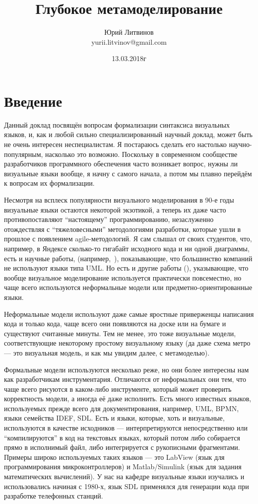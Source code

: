 \documentclass[a5paper]{article}
\title{Глубокое метамоделирование}
\author{Юрий Литвинов\\\small{yurii.litvinov@gmail.com}}
\date{13.03.2018г}
\begin{document}
\maketitle
\thispagestyle{empty}

\section*{Введение}

Данный доклад посвящён вопросам формализации синтаксиса визуальных языков, и, как и любой сильно специализированный научный доклад, может быть не очень интересен неспециалистам. Я постараюсь сделать его настолько научно-популярным, насколько это возможно. Поскольку в современном сообществе разработчиков программного обеспечения часто возникает вопрос, нужны ли визуальные языки вообще, я начну с самого начала, а потом мы плавно перейдём к вопросам их формализации.

Несмотря на всплеск популярности визуального моделирования в 90-е годы визуальные языки остаются некоторой экзотикой, а теперь их даже часто противопоставляют ``настоящему'' программированию, незаслуженно отождествляя с ``тяжеловесными'' методологиями разработки, которые ушли в прошлое с появлением agile-методологий. Я сам слышал от своих студентов, что, например, в Яндексе сколько-то гигабайт исходного кода и ни одной диаграммы, есть и научные работы, (например,~\cite{petre2013uml}), показывающие, что большинство компаний не используют языки типа UML. Но есть и другие работы (\cite{whittle2014mde}), указывающие, что вообще визуальное моделирование используется практически повсеместно, но чаще всего используются неформальные модели или предметно-ориентированные языки.

Неформальные модели используют даже самые яростные приверженцы написания кода и только кода, чаще всего они появляются на доске или на бумаге и существуют считанные минуты. Тем не менее, это тоже визуальные модели, соответствующие некоторому простому визуальному языку (да даже схема метро --- это визуальная модель, и как мы увидим далее, с метамоделью). 

Формальные модели используются несколько реже, но они более интересны нам как разработчикам инструментария. Отличаются от неформальных они тем, что чаще всего рисуются в каком-либо инструменте, который может проверить корректность модели, а иногда её даже исполнить. Есть много известных языков, используемых прежде всего для документирования, например, UML, BPMN, языки семейства IDEF, SDL. Есть и языки, которые, хоть и визуальные, используются в качестве исходников --- интерпретируются непосредственно или ``компилируются'' в код на текстовых языках, который потом либо собирается прямо в исполнимый файл, либо интегрируется с рукописными фрагментами. Примеры широко используемых таких языков --- это LabView (язык для программирования микроконтроллеров) и Matlab/Simulink (язык для задания математических вычислений). У нас на кафедре визуальные языки изучались и использовались начиная с 1980-х, язык SDL применялся для генерации кода при разработке телефонных станций.
\end{document}
